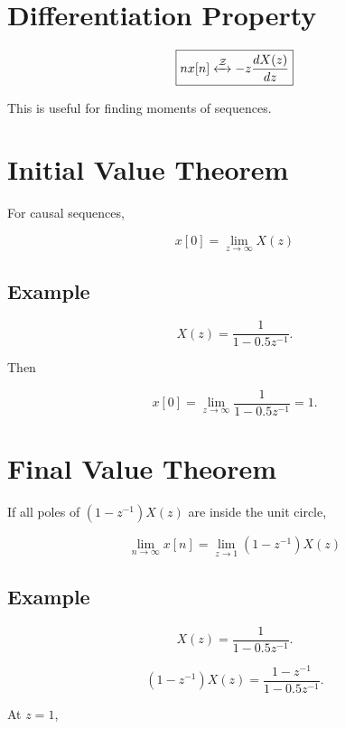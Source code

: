 \section{Differentiation Property}

\[
\boxed{
nx[n]
\xleftrightarrow{\mathcal{Z}}
-z\frac{dX(z)}{dz}
}
\]

This is useful for finding moments of sequences.


\section{Initial Value Theorem}

For causal sequences,

\[
\boxed{
x[0]=\lim_{z\to\infty}X(z)
}
\]


\subsection{Example}

\[
X(z)=
\frac{1}{1-0.5z^{-1}}.
\]

Then

\[
x[0]=
\lim_{z\to\infty}
\frac{1}{1-0.5z^{-1}}
=1.
\]


\section{Final Value Theorem}

If all poles of \((1-z^{-1})X(z)\) are inside the unit circle,

\[
\boxed{
\lim_{n\to\infty}x[n]
=
\lim_{z\to1}(1-z^{-1})X(z)
}
\]


\subsection{Example}

\[
X(z)=
\frac{1}{1-0.5z^{-1}}.
\]

\[
(1-z^{-1})X(z)=
\frac{1-z^{-1}}{1-0.5z^{-1}}.
\]

At \(z=1\),

